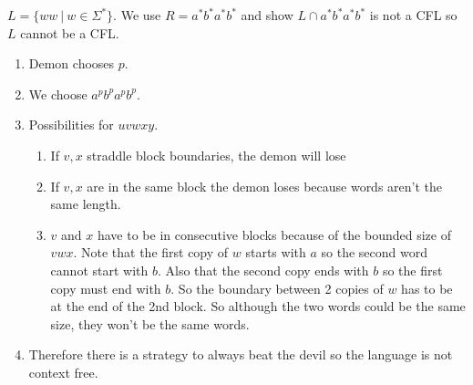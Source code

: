 \documentclass[../598comp.tex]{subfiles}
\begin{document}
\begin{example}
  $L = \{ww \ | \ w \in \Sigma^*\}$. We use $R = a^*b^*a^*b^*$ and show $L \cap a^*b^*a^*b^*$ is not a CFL so $L$
  cannot be a CFL.

  \begin{enumerate}
  \item 
    Demon chooses $p$.
  \item
    We choose $a^pb^pa^pb^p$.
  \item
    Possibilities for $uvwxy$.
    \begin{enumerate}
    \item 
      If $v, x$ straddle block boundaries, the demon will lose
    \item
      If $v, x$ are in the same block the demon loses because words aren't the
      same length.
    \item
      $v$ and $x$ have to be in consecutive blocks because of the bounded size
      of $vwx$. Note that the first copy of $w$ starts with $a$ so the second
      word cannot start with $b$. Also that the second copy ends with $b$ so the
      first copy must end with $b$. So the boundary between 2 copies of $w$ has
      to be at the end of the 2nd block. So although the two words could be the
      same size, they won't be the same words.
    \end{enumerate}
  \item
    Therefore there is a strategy to always beat the devil so the language is
    not context free.
  \end{enumerate}
\end{example}
\end{document}
